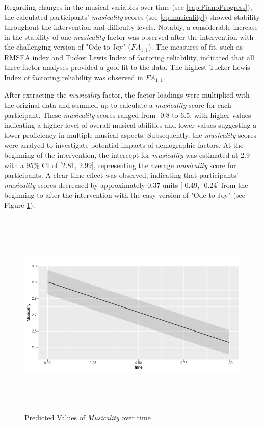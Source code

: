 Regarding changes in the musical variables over time (see \ref{cap:PianoProgress}), the calculated participants' \textit{musicality} scores (see \ref{eq:musicality}) showed stability throughout the intervention and difficulty levels. Notably, a considerable increase in the stability of one \textit{musicality} factor was observed after the intervention with the challenging version of "Ode to Joy" ($FA_{1,1}$). The measures of fit, such as RMSEA index and Tucker Lewis Index of factoring reliability, indicated that all three factor analyses provided a goof fit to the data. The highest Tucker Lewis Index of factoring reliability was observed in $FA_{1,1}$.

After extracting the \textit{musicality} factor, the factor loadings were multiplied with the original data and summed up to calculate a \textit{musicality} score for each participant. These \textit{musicality} scores ranged from -0.8 to 6.5, with higher values indicating a higher level of overall musical abilities and lower values suggesting a lower proficiency in multiple musical aspects. Subsequently, the \textit{musicality} scores were analyed to investigate potential impacts of demographic factors. 
At the beginning of the intervention, the intercept for \textit{musicality} was estimated at 2.9 with a 95\% CI  of [2.81, 2.99], representing the average \textit{musicality} score for participants. A clear time effect was observed, indicating that participants' \textit{musicality} scores decreased by approximately 0.37 units [-0.49, -0.24] from the beginning to after the intervention with the easy version of "Ode to Joy" (see Figure \ref{fig:mus}).
\begin{figure}[h]
	\centering
	\includegraphics[width=15cm,height=10cm,keepaspectratio]{Musicality}
	\caption{Predicted Values of \textit{Musicality} over time}
	\label{fig:mus}
\end{figure}

